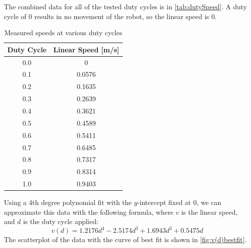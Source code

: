 \documentclass[fontsize=11pt, %
                             paper=letter, %
                             openany, %
                             captions=tableheading,
                             index=totoc,
                             hyperref]{labbook}
\begin{document}
\begin{addmargin}[0cm]{0cm}
The combined data for all of the tested duty cycles is in \autoref{tab:dutySpeed}. A duty cycle of 0 results in no movement of the robot, so the linear speed is 0.

\begin{table}[h!]
    \centering
    \begin{tabular}{c|c}
        \toprule
        \textbf{Duty Cycle} & \textbf{Linear Speed [m/s]}\\
        \toprule
        0.0 & 0\\
        0.1 & 0.0576\\
        0.2 & 0.1635\\
        0.3 & 0.2639\\
        0.4 & 0.3621\\
        0.5 & 0.4589\\
        0.6 & 0.5411\\
        0.7 & 0.6485\\
        0.8 & 0.7317\\
        0.9 & 0.8314\\
        1.0 & 0.9403\\
        \bottomrule
    \end{tabular}
    \caption{Measured speeds at various duty cycles}
    \label{tab:dutySpeed}
\end{table}

Using a 4th degree polynomial fit with the $y$-intercept fixed at 0, we can approximate this data with the following formula, where $v$ is the linear speed, and $d$ is the duty cycle applied:
\begin{equation}
    \label{eq:v(d)}
    v(d) = 1.2176d^4 - 2.5174d^3 + 1.6943d^2 + 0.5475d
\end{equation}
The scatterplot of the data with the curve of best fit is shown in \autoref{fig:v(d)bestfit}.

\begin{figure}[h!]
    \center
\end{figure}
\end{addmargin}
\end{document}
